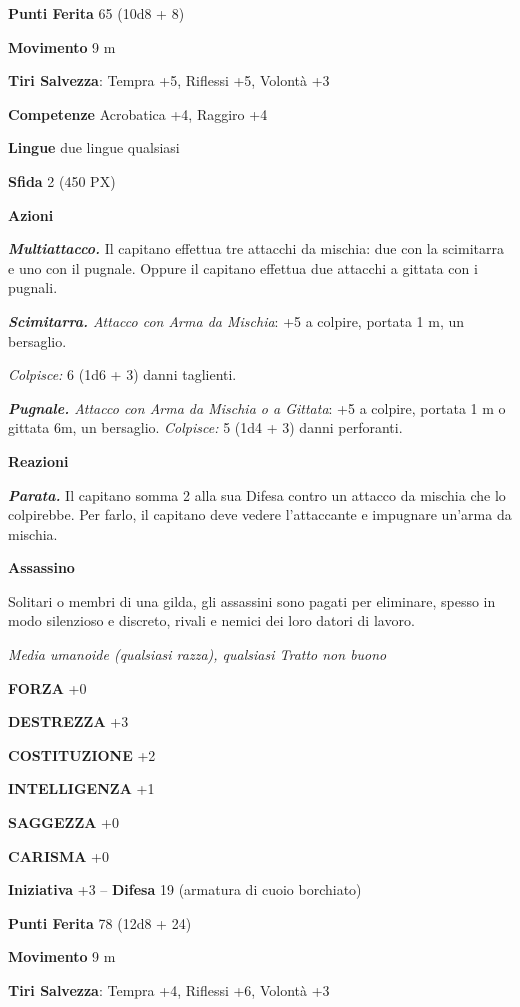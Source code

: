 \begin{multicols}{2}
\textbf{Punti Ferita} 65 (10d8 + 8)

\textbf{Movimento} 9 m

\textbf{Tiri Salvezza}: Tempra +5, Riflessi +5, Volontà +3

\textbf{Competenze} Acrobatica +4, Raggiro +4

\textbf{Lingue} due lingue qualsiasi

\textbf{Sfida} 2 (450 PX)

\textbf{Azioni}

\textit{\textbf{Multiattacco.}} Il capitano effettua tre attacchi da mischia: due con la scimitarra e uno con il pugnale. Oppure il capitano effettua due attacchi a gittata con i pugnali.

\textit{\textbf{Scimitarra.} Attacco con Arma da Mischia}: +5 a colpire, portata 1 m, un bersaglio.

\textit{Colpisce:} 6 (1d6 + 3) danni taglienti.

\textit{\textbf{Pugnale.} Attacco con Arma da Mischia o a Gittata}: +5 a colpire, portata 1 m o gittata 6m, un bersaglio. \textit{Colpisce:} 5 (1d4 + 3) danni perforanti.

\textbf{Reazioni}

\textit{\textbf{Parata.}} Il capitano somma 2 alla sua Difesa contro un attacco da mischia che lo colpirebbe. Per farlo, il capitano deve vedere l'attaccante e impugnare un'arma da mischia.

\medskip\textbf{Assassino}

Solitari o membri di una gilda, gli assassini sono pagati per eliminare, spesso in modo silenzioso e discreto, rivali e nemici dei loro datori di lavoro.

\textit{Media umanoide (qualsiasi razza), qualsiasi Tratto non buono}

\textbf{FORZA} +0

\textbf{DESTREZZA} +3

\textbf{COSTITUZIONE} +2

\textbf{INTELLIGENZA} +1

\textbf{SAGGEZZA} +0

\textbf{CARISMA} +0

\textbf{Iniziativa} +3 -- \textbf{Difesa} 19 (armatura di cuoio borchiato)

\textbf{Punti Ferita} 78 (12d8 + 24)

\textbf{Movimento} 9 m

\textbf{Tiri Salvezza}: Tempra +4, Riflessi +6, Volontà +3


\end{multicols}
